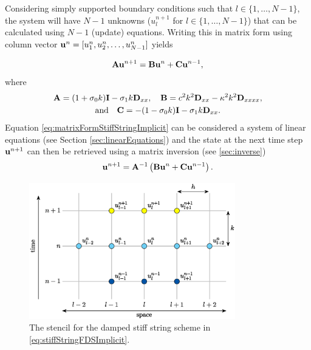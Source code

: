{Considering simply supported boundary conditions such that $l \in \{1, \hdots, N-1\}$, the system will have $N-1$ unknowns ($u_l^{n+1}$ for $l \in \{1, \hdots, N-1\}$) that can be calculated using $N-1$ (update) equations. Writing this in matrix form using column vector $\mathbf{u}^n = [u_1^n, u_2^n, \hdots, u_{N-1}^n]$ yields 

\begin{equation}\label{eq:matrixFormStiffStringImplicit}
    \mathbf{A}\mathbf{u}^{n+1} = \mathbf{B}\mathbf{u}^n + \mathbf{C} \mathbf{u}^{n-1},
\end{equation}
where 
\begin{equation*}
    \begin{gathered}
    \mathbf{A} = (1+\sigma_{0} k)\mathbf{I} - \sigma_{1} k\mathbf{D}_{xx}, \quad \mathbf{B} = c^2 k^2 \mathbf{D}_{xx} - \kappa^2 k^2 \mathbf{D}_{xxxx}, \\
    \text{and} \quad \mathbf{C} = -(1-\sigma_{0} k)\mathbf{I} - \sigma_{1} k \mathbf{D}_{xx}.
    \end{gathered}
\end{equation*}
Equation \eqref{eq:matrixFormStiffStringImplicit} can be considered a system of linear equations (see Section \ref{sec:linearEquations}) and the state at the next time step $\mathbf{u}^{n+1}$ can then be retrieved using a matrix inversion (see \ref{sec:inverse})
\begin{equation}
    \mathbf{u}^{n+1} = \mathbf{A}^{-1}\left(\mathbf{B}\mathbf{u}^n + \mathbf{C} \mathbf{u}^{n-1}\right).
\end{equation}
\begin{figure}[h]
    \centering
    \includegraphics[width=0.8\textwidth]{figures/resonators/stencilImplicitStiffString.eps}
    \caption{The stencil for the damped stiff string scheme in \eqref{eq:stiffStringFDSImplicit}.\label{fig:stencilStiffStringImplicit}}
\end{figure}

}
